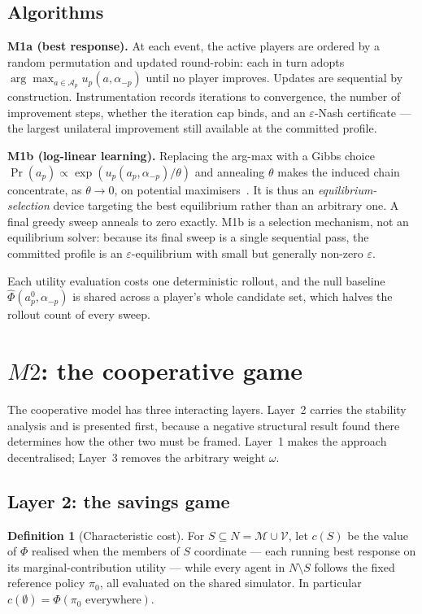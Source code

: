 \documentclass[preprint, 3p, review, 12pt]{elsarticle}
\theoremstyle{definition}
\newtheorem{definition}[theorem]{Definition}
\begin{document}
\subsection{Algorithms}
\textbf{M1a (best response).} At each event, the active players are ordered by a random
permutation and updated round-robin: each in turn adopts
$\arg\max_{a\in\mathcal{A}_p} u_p(a,\alpha_{-p})$ until no player improves. Updates are
sequential by construction. Instrumentation records iterations to convergence, the number of
improvement steps, whether the iteration cap binds, and an $\varepsilon$-Nash certificate ---
the largest unilateral improvement still available at the committed profile.

\textbf{M1b (log-linear learning).} Replacing the arg-max with a Gibbs choice
$\Pr(a_p)\propto\exp(u_p(a_p,\alpha_{-p})/\theta)$ and annealing $\theta$ makes the induced
chain concentrate, as $\theta\to0$, on potential maximisers~\citep{blume1993statistical}. It
is thus an \emph{equilibrium-selection} device targeting the best equilibrium rather than an
arbitrary one. A final greedy sweep anneals to zero exactly. M1b is a selection mechanism,
not an equilibrium solver: because its final sweep is a single sequential pass, the committed
profile is an $\varepsilon$-equilibrium with small but generally non-zero $\varepsilon$.

Each utility evaluation costs one deterministic rollout, and the null baseline
$\widehat{\Phi}(a_p^{0},\alpha_{-p})$ is shared across a player's whole candidate set, which
halves the rollout count of every sweep.

\section{$M2$: the cooperative game}
\label{sec:m2}

The cooperative model has three interacting layers. Layer~2 carries the stability analysis
and is presented first, because a negative structural result found there determines how the
other two must be framed. Layer~1 makes the approach decentralised; Layer~3 removes the
arbitrary weight $\omega$.

\subsection{Layer 2: the savings game}
\label{sec:layer2}

\begin{definition}[Characteristic cost]
\label{def:c}
For $S\subseteq N=\mathcal{M}\cup\mathcal{V}$, let $c(S)$ be the value of $\Phi$ realised
when the members of $S$ coordinate --- each running best response on its
marginal-contribution utility --- while every agent in $N\setminus S$ follows the fixed
reference policy $\pi_0$, all evaluated on the shared simulator. In particular
$c(\emptyset)=\Phi(\pi_0 \text{ everywhere})$.
\end{definition}
\end{document}
